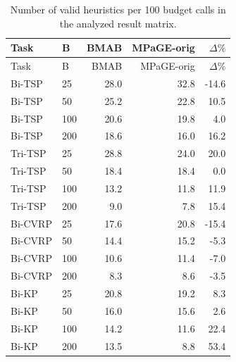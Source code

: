 \begin{longtable}{llrrr}
\caption[Valid heuristics per 100 calls]{Number of valid heuristics per 100 budget calls in the analyzed result matrix.}
\label{tab:validity-results}\\
\toprule
Task & B & BMAB & MPaGE-orig & $\Delta\%$ \\
\midrule
\endfirsthead
\toprule
Task & B & BMAB & MPaGE-orig & $\Delta\%$ \\
\midrule
\endhead
Bi-TSP & 25 & 28.0 & 32.8 & -14.6 \\
Bi-TSP & 50 & 25.2 & 22.8 & 10.5 \\
Bi-TSP & 100 & 20.6 & 19.8 & 4.0 \\
Bi-TSP & 200 & 18.6 & 16.0 & 16.2 \\
Tri-TSP & 25 & 28.8 & 24.0 & 20.0 \\
Tri-TSP & 50 & 18.4 & 18.4 & 0.0 \\
Tri-TSP & 100 & 13.2 & 11.8 & 11.9 \\
Tri-TSP & 200 & 9.0 & 7.8 & 15.4 \\
Bi-CVRP & 25 & 17.6 & 20.8 & -15.4 \\
Bi-CVRP & 50 & 14.4 & 15.2 & -5.3 \\
Bi-CVRP & 100 & 10.6 & 11.4 & -7.0 \\
Bi-CVRP & 200 & 8.3 & 8.6 & -3.5 \\
Bi-KP & 25 & 20.8 & 19.2 & 8.3 \\
Bi-KP & 50 & 16.0 & 15.6 & 2.6 \\
Bi-KP & 100 & 14.2 & 11.6 & 22.4 \\
Bi-KP & 200 & 13.5 & 8.8 & 53.4 \\
\bottomrule
\end{longtable}
